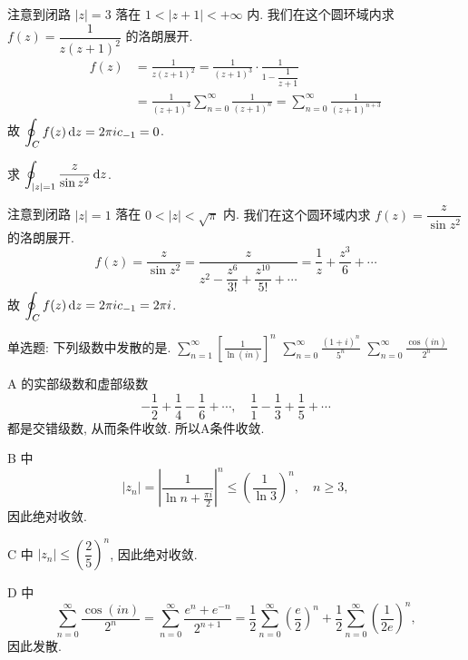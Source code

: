 \begin{solution}
	注意到闭路 $|z|=3$ 落在 $1<|z+1|<+\infty$ 内.
	{我们在这个圆环域内求 $f(z)=\dfrac1{z(z+1)^2}$ 的洛朗展开.
		\begin{align*}
		f(z)&=\frac1{z(z+1)^2}=\frac1{(z+1)^3}\cdot\frac1{1-\dfrac1{z+1}}\\
		&{=\frac1{(z+1)^3}\sum_{n=0}^\infty\frac1{(z+1)^n}}
		{=\sum_{n=0}^{\infty}\frac1{(z+1)^{n+3}}}
		\end{align*}故
		$\displaystyle\oint_Cf(z)\,\mathrm{d} z=2\pi i c_{-1}=0$.}
\end{solution}
% 

\begin{example}
	求 $\displaystyle\oint_{|z|=1}\frac{z}{\sin z^2}\,\mathrm{d} z$.
\end{example}

\begin{solution}
	注意到闭路 $|z|=1$ 落在 $0<|z|<\sqrt \pi$ 内.
	{我们在这个圆环域内求 $f(z)=\dfrac{z}{\sin z^2}$ 的洛朗展开.
		\[
		f(z)=\frac{z}{\sin z^2}=
		\frac{z}{z^2-\dfrac{z^6}{3!}+\dfrac{z^{10}}{5!}+\cdots}
		{=\frac1z+\frac{z^3}6+\cdots}
		\]故
		$\displaystyle\oint_Cf(z)\,\mathrm{d} z=2\pi i c_{-1}=2\pi i$.}
\end{solution}





\begin{exercise}
	单选题: 下列级数中发散的是.
	{$\displaystyle\sum_{n=1}^\infty\left[\frac{1}{\ln (in)}\right]^n$}%
	{$\displaystyle\sum_{n=0}^\infty\frac{(1+i)^n}{5^n}$}%
	{$\displaystyle\sum_{n=0}^\infty\frac{\cos(in)}{2^n}$}
\end{exercise}
\begin{solution}[解析]
	A 的实部级数和虚部级数
	\[-\frac12+\frac14-\frac16+\cdots,\quad
	\frac11-\frac13+\frac15+\cdots\]
	都是交错级数, 从而条件收敛. 所以A条件收敛.

	B 中
	\[\left|z_n\right|
	=\left|\frac{1}{\ln n+\frac{\pi i}2}\right|^n
	\le\left(\frac1{\ln 3}\right)^n,\quad n\ge 3,\]
	因此绝对收敛.

	C 中 $|z_n|\le\left(\dfrac{2}5\right)^n$, 因此绝对收敛.

	D 中
	\[\sum_{n=0}^\infty\frac{\cos (in)}{2^n}
	=\sum_{n=0}^\infty\frac{e^n+e^{-n}}{2^{n+1}}
	=\frac12\sum_{n=0}^\infty\left(\frac e2\right)^n
	+\frac12\sum_{n=0}^\infty\left(\frac 1{2e}\right)^n,\]
	因此发散.
\end{solution}


